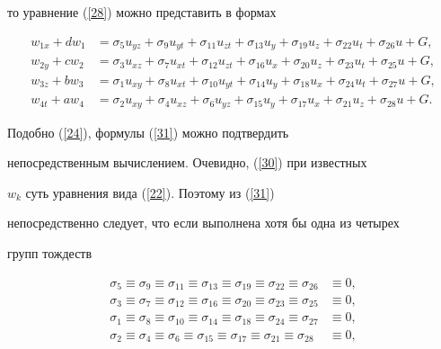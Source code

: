 то уравнение (\ref{28}) можно представить в формах


\begin{equation}\label{31}


\begin{split}


w_{1x}+dw_{1}&=\sigma_{5}u_{yz}+\sigma_{9}u_{yt}+\sigma_{11}u_{zt}


+\sigma_{13}u_{y}+\sigma_{19}u_{z}+\sigma_{22}u_{t}+\sigma_{26}u+G,\\


w_{2y}+cw_{2}&=\sigma_{3}u_{xz}+\sigma_{7}u_{xt}+\sigma_{12}u_{zt}


+\sigma_{16}u_{x}+\sigma_{20}u_{z}+\sigma_{23}u_{t}+\sigma_{25}u+G,\\


w_{3z}+bw_{3}&=\sigma_{1}u_{xy}+\sigma_{8}u_{xt}+\sigma_{10}u_{yt}


+\sigma_{14}u_{y}+\sigma_{18}u_{x}+\sigma_{24}u_{t}+\sigma_{27}u+G,\\


w_{4t}+aw_{4}&=\sigma_{2}u_{xy}+\sigma_{4}u_{xz}+\sigma_{6}u_{yz}


+\sigma_{15}u_{y}+\sigma_{17}u_{x}+\sigma_{21}u_{z}+\sigma_{28}u+G.


\end{split}


\end{equation}


Подобно (\ref{24}), формулы (\ref{31}) можно подтвердить


непосредственным вычислением. Очевидно, (\ref{30}) при известных


$w_{k}$ суть уравнения вида (\ref{22}). Поэтому из (\ref{31})


непосредственно следует, что если выполнена хотя бы одна из четырех


групп тождеств


\begin{equation}\label{32}


\begin{split}


\sigma_{5}\equiv\sigma_{9}\equiv\sigma_{11}\equiv\sigma_{13}


\equiv\sigma_{19}\equiv\sigma_{22}\equiv\sigma_{26}&\equiv0,\\


\sigma_{3}\equiv\sigma_{7}\equiv\sigma_{12}\equiv\sigma_{16}


\equiv\sigma_{20}\equiv\sigma_{23}\equiv\sigma_{25}&\equiv0,\\


\sigma_{1}\equiv\sigma_{8}\equiv\sigma_{10}\equiv\sigma_{14}


\equiv\sigma_{18}\equiv\sigma_{24}\equiv\sigma_{27}&\equiv0,\\


\sigma_{2}\equiv\sigma_{4}\equiv\sigma_{6}\equiv\sigma_{15}


\equiv\sigma_{17}\equiv\sigma_{21}\equiv\sigma_{28}&\equiv0,


\end{split}


\end{equation}


